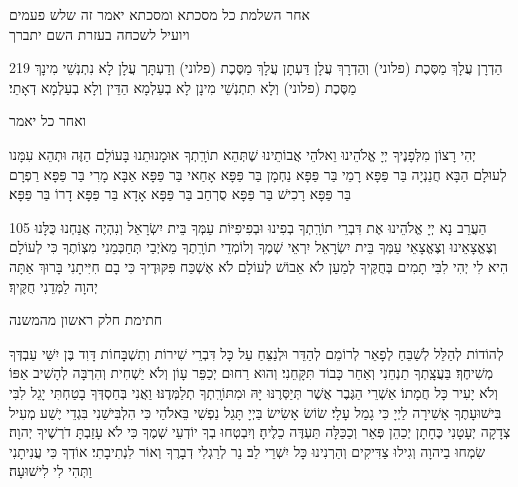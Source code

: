 \clearpage

\centerlastline
{
\small
\parskip 1pt
{\centering
  \scriptsize
   אחר השלמת כל מסכתא ומסכתא יאמר זה שלש פעמים\\ ויועיל לשכחה בעזרת השם יתברך\hdot
}

\begin{tp}{219}
הַדְרָן עֲלָךְ מַסֶּכֶת {\scriptsize(פלוני)} וְהַדְרָךְ עֲלָן\hdot
דַּעְתָן עֲלָךְ מַסֶּכֶת {\scriptsize(פלוני)} וְדַעְתָּך עֲלָן\hdot
לָא נִתְנְשֵׁי מִינָךְ מַסֶּכֶת {\scriptsize(פלוני}) וְלָא תִתְנְשֵׁי מִינָן
לָא בְעַלְמָא הַדֵּין וְלָא בְעַלְמָא דְאָתֵי׃
\end{tp}

{\scriptsize ואחר כל יאמר}

יְהִי רָצוֹן מִלְּפָנֶיךָ יְיָ אֱלֹהֵינוּ וֵאלֹהֵי אֲבוֹתֵינוּ שֶׁתְּהֵא תוֹרָֽתְךָ אוּמָנוּתֵנוּ בָּעוֹלָם הַזֶּה וּתְהֵא עִמָּנו לְעוּלָם הַבָּא\hdot
חֲנַנְיָה בַּר פַּפָּא\hdot
רָמֵי בַּר פַּפָּא\hdot
נַחְמָן בַּר פַּפָּא\hdot
אָחַאי בַּר פַּפָּא\hdot
אַבָּא מָרִי בַּר פַּפָּא\hdot
רַפְרָם בַּר פַּפָּא\hdot
רָכִישׁ בַּר פַּפָּא\hdot
סֻרְחַב בַּר פַּפָּא\hdot
אָדָא בַּר פַּפָּא\hdot
דָרוֹ בַּר פַּפָּא׃

\begin{tp}{105}
הַעֲרֵב נָא יְיָ אֱלֹהֵינוּ אֶת דִּבְרֵי תוֹרָֽתְךָ בְפִינוּ וּבְפִיפִיּוֹת עַמְּךָ בֵּית יִשְׂרָאֵל וְנִהְיֶה אֲנַחְנוּ כֻּלָּנוּ וְצֶאֱצָאֵינוּ וְצֶאֱצָאֵי עַמְּךָ בֵּית יִשְׂרָאֵל יִרְאֵי שְׁמֶךָ וְלוֹמְדֵי תוֹרָֽתֶךָ\hdot
 מֵאֹיְבַי תְּחַכְּמֵנִי מִצְו‍ֹתֶךָ כִּי לְעוֹלָם הִיא לִי\hdot
 יְהִי לִבִּי תָמִים בְּחֻקֶּיךָ לְמַעַן לֹא אֵבוֹשׁ\hdot
 לְעוֹלָם לֹא אֶשְׁכַּח פִּקּוּדֶיךָ כִּי בָם חִיִּיתָנִי\hdot
  בָּרוּךְ אַתָּה יְהוָה לַמְּדֵנִי חֻקֶּיךָ׃
\end{tp}
  
    {\centering
      \larger חתימת חלק ראשון מהמשנה

    }

    לְהוֹדוֹת לְהַלֵּל לְשַׁבֵּחַ לְפָאֵר לְרוֹמֵם לְהַדֵּר וּלְנַצֵּחַ עַל כָּל דִּבְרֵי שִׁירוֹת וְתִשְׁבָּחוֹת דָּוִד בֶּן יִשַּׁי עַבְדְּךָ מְשִׁיחֶךָ׃ בַּעֲצָֽתְךָ תַנְחֵנִי וְאַחַר כָּבוֹד תִּקָּחֵנִי׃
    וְהוּא רַחוּם יְכַפֵּר עָו‍ֹן וְלֹא יַשְׁחִית וְהִרְבָּה לְהָשִׁיב אַפּוֹ וְלֹא יָעִיר כָּל חֲמָתוֹ׃
    אַשְׁרֵי הַגֶּבֶר אֲשֶׁר תְּיַסְּרֶנּוּ יָּהּ וּמִתּוֹרָֽתְךָ תְלַמְּדֶנּוּ׃
    וַאֲנִי בְּחַסְדְּךָ בָטַחְתִּי יָגֵל לִבִּי בִּישׁוּעָתֶךָ אָשִׁירָה לַיְיָ כִּי גָמַל עָלָי׃
    שׂוֹשׂ אָשִׂישׂ בַּיְיָ תָּגֵל נַפְשִׁי בֵּאלֹהַי כִּי הִלְבִּישַׁנִי בִּגְדֵי יֶשַׁע מְעִיל צְדָקָה יְעָטָנִי כֶּחָתָן יְכַהֵן פְּאֵר וְכַכַּלָּה תַּעְדֶּה כֵלֶיהָ׃
    וְיִבְטְחוּ בְךָ יוֹדְעֵי שְׁמֶךָ כִּי לֹא עָזַבְתָּ דֹרְשֶׁיךָ יְהוָה׃
    שִׂמְחוּ בַיהוָה וְגִילוּ צַדִּיקִים וְהַרְנִינוּ כָּל יִשְׁרֵי לֵב׃
    נֵר לְרַגְלִי דְבָרֶךָ וְאוֹר לִנְתִיבָתִי׃
    אוֹדְךָ כִּי עֲנִיתָנִי וַתְּהִי לִי לִישׁוּעָה׃
    
}
